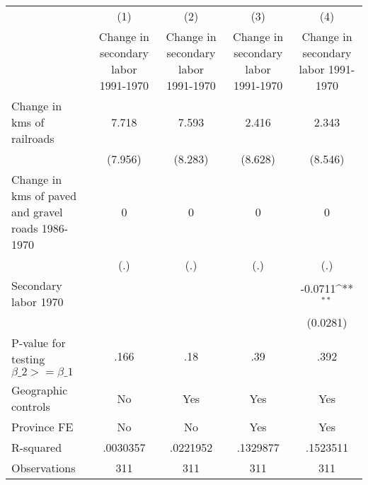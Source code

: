 {
\def\sym#1{\ifmmode^{#1}\else\(^{#1}\)\fi}
\begin{tabular}{l*{4}{c}}
\hline\hline
                &\multicolumn{1}{c}{(1)}&\multicolumn{1}{c}{(2)}&\multicolumn{1}{c}{(3)}&\multicolumn{1}{c}{(4)}\\
                &\multicolumn{1}{c}{Change in secondary labor 1991-1970}&\multicolumn{1}{c}{Change in secondary labor 1991-1970}&\multicolumn{1}{c}{Change in secondary labor 1991-1970}&\multicolumn{1}{c}{Change in secondary labor 1991-1970}\\
\hline
Change in kms of railroads&    7.718         &    7.593         &    2.416         &    2.343         \\
                &  (7.956)         &  (8.283)         &  (8.628)         &  (8.546)         \\
[1em]
Change in kms of paved and gravel roads 1986-1970&        0         &        0         &        0         &        0         \\
                &      (.)         &      (.)         &      (.)         &      (.)         \\
[1em]
Secondary labor 1970&                  &                  &                  &  -0.0711\sym{**} \\
                &                  &                  &                  & (0.0281)         \\
\hline
P-value for testing $\beta\_{2} >= \beta\_{1}$&     .166         &      .18         &      .39         &     .392         \\
Geographic controls&       No         &      Yes         &      Yes         &      Yes         \\
Province FE     &       No         &       No         &      Yes         &      Yes         \\
R-squared       & .0030357         & .0221952         & .1329877         & .1523511         \\
Observations    &      311         &      311         &      311         &      311         \\
\hline\hline
\end{tabular}
}
